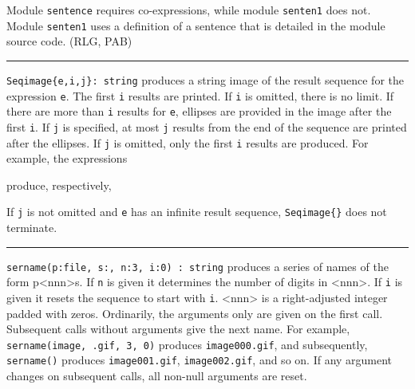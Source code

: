 Module \texttt{sentence} requires co-expressions, while module
\texttt{senten1} does not. Module \texttt{senten1} uses a definition of
a {\textquotedbl}sentence{\textquotedbl} that is detailed in the module
source code. (RLG, PAB)

\vspace{0.25cm}\hrule{}

\texttt{Seqimage\{e,i,j\}: string} produces a string image of the result
sequence for the expression \texttt{e}.  The first \texttt{i}
results are printed. If \texttt{i} is omitted, there is no limit. If
there are more than \texttt{i} results for \texttt{e}, ellipses are
provided in the image after the first \texttt{i}. If \texttt{j} is
specified, at most \texttt{j} results from the end of the sequence are
printed after the ellipses. If \texttt{j} is omitted, only the first
\texttt{i} results are produced. For example, the expressions 


produce, respectively, 


If \texttt{j} is not omitted and \texttt{e} has an infinite result
sequence, \texttt{Seqimage\{\}} does not terminate.

\vspace{0.25cm}\hrule{}

\texttt{sername(p:{\textquotedbl}file{\textquotedbl},
s:{\textquotedbl}{\textquotedbl}, n:3, i:0) : string} produces a series
of names of the form p{\textless}nnn{\textgreater}s. If \texttt{n} is
given it determines the number of digits in
{\textless}nnn{\textgreater}. If \texttt{i} is given it resets the
sequence to start with \texttt{i}. {\textless}nnn{\textgreater} is a
right-adjusted integer padded with zeros. Ordinarily, the arguments
only are given on the first call. Subsequent calls without arguments
give the next name. For example,
\texttt{sername({\textquotedbl}image{\textquotedbl},
{\textquotedbl}.gif{\textquotedbl}, 3, 0)} produces
\texttt{{\textquotedbl}image000.gif{\textquotedbl}}, and subsequently,
\texttt{sername()} produces
\texttt{{\textquotedbl}image001.gif{\textquotedbl}},
\texttt{{\textquotedbl}image002.gif{\textquotedbl}}, and so on. If any
argument changes on subsequent calls, all non-null arguments are reset.


